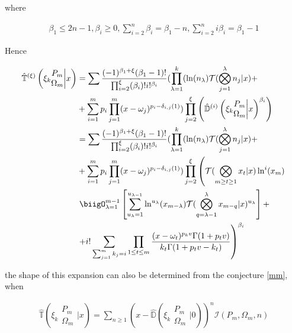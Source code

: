 where

\begin{align}
        \beta_1 \leq 2n-1,  \beta_i \geq 0,  \sum_{i=2}^n \beta_i = \beta_1 - n,
        \sum_{i=2}^n i \beta_i = \beta_1 - 1
\end{align}

Hence

\begin{align}
        \hat{\mathbb{T}}^{(\xi)}\left( \xi_k \begin{matrix} P_m \\ \Omega_m 
        \end{matrix} \bigg| x  \right) &= \sum \frac{(-1)^{\beta_1 + \xi}(\beta_1 
        -1)!}{\prod_{i=2}^\xi (\beta_i)!i!^{\beta_i}} (\prod_{\lambda = 1}^k
        (\ln(n_\lambda) \mathcal{T}(\bigotimes_{j=1}^\lambda n_j |x) + \\
        &+\sum_{i=1}^m p_i \prod_{j=1}^m (x-\omega_j)^{p_i-\delta_{i, j}(1)} 
        )\prod_{j=2}^\xi \left(\hat{\mathbb{D}}^{(i)}\left( \xi_k \begin{matrix}
        P_m \\ \Omega_m \end{matrix} \bigg| x  \right)^{\beta_i}\right)\\
        &= \sum \frac{(-1)^{\beta_1 + \xi}(\beta_1 -1)!}{\prod_{i=2}^\xi 
        (\beta_i)!i!^{\beta_i}} (\prod_{\lambda = 1}^k (\ln(n_\lambda) 
        \mathcal{T}(\bigotimes_{j=1}^\lambda n_j |x) + \\
        &+\sum_{i=1}^m p_i \prod_{j=1}^m (x-\omega_j)^{p_i-\delta_{i, j}(1)} 
        )\prod_{j=2}^\xi \left(\mathcal{T}(\bigotimes_{m \geq t \geq 1}x_t| 
        x) \ln^i (x_m) \right.\\
        &\left. \biigO_{\lambda = 1}^{m-1} \left[\sum_{u_{\lambda}=1}^{u_{\lambda-1}}
        \ln^{u_{\lambda}}(x_{m-\lambda}) \mathcal{T}(\bigotimes_{q = \lambda-1}^\lambda x_{m-q}
        |x)^{u_{\lambda}} \right] + \right.\\
        &\left.+ i! \sum_{\sum_{j=1}^m k_j = i}\prod_{1 \leq t \leq m} \frac{(x -
        \omega_t)^{p_k v}\Gamma(1+p_t v)}{k_t\Gamma(1+p_t v - k_t)}\right)^{\beta_i}
        \label{awesome}
\end{align}

the shape of this expansion can also be determined from the conjecture \ref{mm}, when

\begin{align}
        \hat{\mathbb{T}}\left( \xi_k \begin{matrix} P_m \\ \Omega_m 
        \end{matrix} \bigg| x \right) 
        = \sum_{n \geq 1} \left( x - \hat{\mathbb{D}}\left( \xi_k
        
        \begin{matrix} 
                P_m \\ \Omega_m 
        \end{matrix} 
        
        \bigg| 0 \right)\right)^n 
        \mathcal{I}(P_m, \Omega_m, n)
\end{align}

